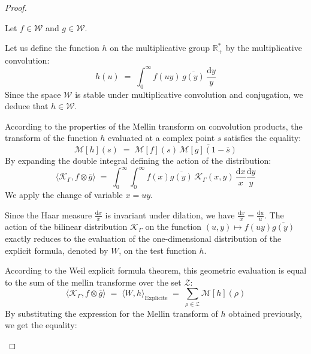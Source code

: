 \documentclass[Riemann_Hypothesis.tex]{subfiles}
\begin{document}
\begin{proof}
    \begin{part_proof}
        Let $f \in \mathcal{W}$ and $g \in \mathcal{W}$. \par
        Let us define the function $h$ on the multiplicative group $\mathbb{R}_+^*$ by the multiplicative convolution:
        \begin{equation*}
            h(u) \;=\; \int_{0}^{\infty} f(uy) \, \overline{g(y)} \, \frac{\mathrm{d}y}{y}
        \end{equation*}
        Since the space $\mathcal{W}$ is stable under multiplicative convolution and conjugation, we deduce that $h \in \mathcal{W}$. \par
        According to the properties of the Mellin transform on convolution products, the transform of the function $h$ evaluated at a complex point $s$ satisfies the equality:
        \begin{equation*}
            \mathcal{M}[h](s) \;=\; \mathcal{M}[f](s) \, \overline{\mathcal{M}[g](1 - \overline{s})}
        \end{equation*}
        By expanding the double integral defining the action of the distribution:
        \begin{equation*}
            \langle \mathcal{K}_{\Gamma}, f \otimes \overline{g} \rangle \;=\; \int_{0}^{\infty} \int_{0}^{\infty} f(x) \overline{g(y)} \, \mathcal{K}_{\Gamma}(x,y) \, \frac{\mathrm{d}x}{x} \frac{\mathrm{d}y}{y}
        \end{equation*}
        We apply the change of variable $x = uy$. \par
        Since the Haar measure $\frac{\mathrm{d}x}{x}$ is invariant under dilation, we have $\frac{\mathrm{d}x}{x} = \frac{\mathrm{d}u}{u}$. The action of the bilinear distribution $\mathcal{K}_{\Gamma}$ on the function $(u, y) \mapsto f(uy)\overline{g(y)}$ exactly reduces to the evaluation of the one-dimensional distribution of the explicit formula, denoted by $W$, on the test function $h$. \par
        According to the Weil explicit formula theorem, this geometric 
        evaluation is equal to the sum of the mellin transforme over the set $\mathcal{Z}$:
        \begin{equation*}
            \langle \mathcal{K}_{\Gamma}, f \otimes \overline{g} \rangle \;=\; \langle W, h \rangle_{\text{Explicite}} \;=\; \sum_{\rho \in \mathcal{Z}} \mathcal{M}[h](\rho)
        \end{equation*}
        By substituting the expression for the Mellin transform of $h$ obtained previously, we get the equality:

\end{part_proof}
\end{proof}
\end{document}
